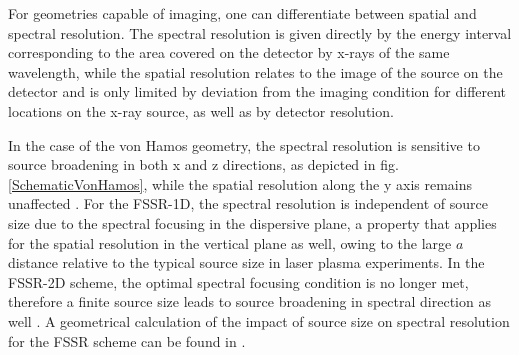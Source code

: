 For geometries capable of imaging, one can differentiate between spatial and 
spectral resolution. The spectral resolution is given directly by the energy 
interval corresponding to the area covered on the detector by x-rays of the 
same wavelength, while the spatial resolution relates to the image of the source 
on the detector and is only limited by deviation from the imaging 
condition for different locations on the x-ray source, as well as by detector resolution.

In the case of the von Hamos geometry, the spectral 
resolution is sensitive to source broadening in both x and z directions, as 
depicted in fig. \ref{SchematicVonHamos}, while the spatial resolution along 
the y axis remains unaffected \citep{renner2019challenges}. For the FSSR-1D, 
the spectral 
resolution is independent of source size due to the spectral focusing in the 
dispersive plane, a property that applies for the spatial resolution in the 
vertical plane as well, owing to the large $a$ distance relative to the typical 
source size in laser plasma experiments. In the FSSR-2D scheme, the optimal 
spectral focusing condition is no longer met, therefore a finite source size 
leads to source broadening in spectral direction as well \citep{monot2002high}. A geometrical calculation of the 
impact of source size on spectral resolution for the FSSR scheme can be found 
in \citep{young1998high}. 













